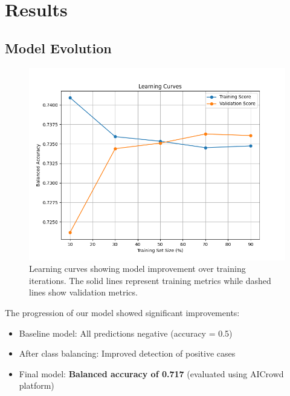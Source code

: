 \documentclass[10pt,conference,compsocconf]{IEEEtran}
\begin{document}
\section{Results}

\subsection{Model Evolution}
\begin{figure}[H]
    \centering
    \includegraphics[width=0.95\columnwidth]{figures/learning_curves.png}
    \caption{Learning curves showing model improvement over training iterations.
    The solid lines represent training metrics while dashed lines show validation metrics.}
    \label{fig:learning}
\end{figure}

The progression of our model showed significant improvements:
\begin{itemize}
    \item Baseline model: All predictions negative (accuracy = 0.5)
    \item After class balancing: Improved detection of positive cases
    \item Final model: \textbf{Balanced accuracy of 0.717} (evaluated using AICrowd platform)
\end{itemize}
\end{document}
